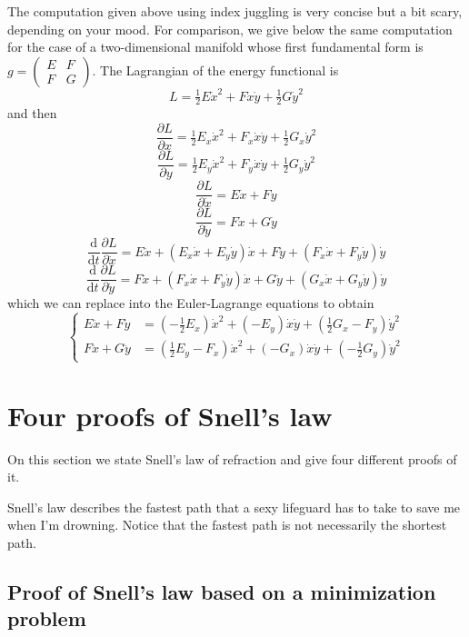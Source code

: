 The computation given above using index juggling is very concise but a bit
scary, depending on your mood.  For comparison, we give below the same
computation for the case of a two-dimensional manifold whose first
fundamental form
is~$g=\left(\begin{smallmatrix}E & F \\ F & G\end{smallmatrix}\right)$.  The
Lagrangian of the energy functional is
$$
L=
\tfrac{1}{2}E\dot x^2+F\dot x\dot y+\tfrac{1}{2}G\dot y^2
$$
and then
$$
\frac{\partial L}{\partial x}
=
\tfrac{1}{2}E_x\dot x^2+F_x\dot x\dot y+\tfrac{1}{2}G_x\dot y^2
$$
$$
\frac{\partial L}{\partial y}
=
\tfrac{1}{2}E_y\dot x^2+F_y\dot x\dot y+\tfrac{1}{2}G_y\dot y^2
$$
$$
\frac{\partial L}{\partial \dot x}
=
E\dot x+F\dot y
$$
$$
\frac{\partial L}{\partial \dot y}
=
F\dot x+G\dot y
$$
$$
\frac{\mathrm{d}}{\mathrm{d} t}
\frac{\partial L}{\partial \dot x}
=
E\ddot x
+\left(E_x\dot x+E_y\dot y\right)\dot x
+F\ddot y
+\left(F_x\dot x+F_y\dot y\right)\dot y
$$
$$
\frac{\mathrm{d}}{\mathrm{d} t}
\frac{\partial L}{\partial \dot y}
=
F\ddot x
+\left(F_x\dot x+F_y\dot y\right)\dot x
+G\ddot y
+\left(G_x\dot x+G_y\dot y\right)\dot y
$$
which we can replace into the Euler-Lagrange equations to obtain
$$
\begin{cases}
	E\ddot x+F\ddot y &=
	\left(-\tfrac{1}{2}E_x\right)\dot x^2
	+\left(-E_y\right)\dot x\dot y
	+\left(\tfrac{1}{2}G_x-F_y\right)\dot y^2
	\\
	F\ddot x+G\ddot y &=
	\left(\tfrac{1}{2}E_y-F_x\right)\dot x^2
	+\left(-G_x\right)\dot x\dot y
	+
	\left(-\tfrac{1}{2}G_y\right)\dot y^2
\end{cases}
$$




\section{Four proofs of Snell's law}

On this section we state Snell's law of refraction and give four different
proofs of it.

Snell's law describes the fastest path that a sexy lifeguard has to take to
save me when I'm drowning.  Notice that the fastest path is not necessarily the shortest path.

\subsection{Proof of Snell's law based on a minimization problem}

